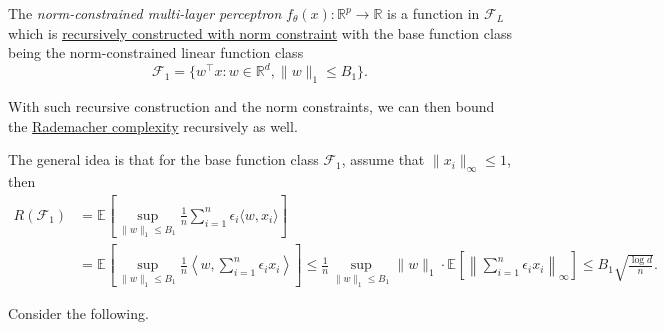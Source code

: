 \begin{definition}\label{def:norm-MLP}
	The \emph{norm-constrained multi-layer perceptron} \(f_\theta (x) \colon \mathbb{R} ^p \to \mathbb{R} \) is a function in \(\mathscr{F} _L\) which is \hyperref[def:norm-recursive]{recursively constructed with norm constraint} with the base function class being the norm-constrained linear function class
	\[
		\mathscr{F} _1 = \{ w^{\top} x \colon w \in \mathbb{R} ^d, \lVert w \rVert _1 \leq B_1 \}.
	\]
\end{definition}

With such recursive construction and the norm constraints, we can then bound the \hyperref[def:Rademacher-complexity]{Rademacher complexity} recursively as well.

\begin{intuition}\label{int:recursive}
	The general idea is that for the base function class \(\mathscr{F} _1\), assume that \(\lVert x_i \rVert _\infty \leq 1\), then
	\[
		\begin{split}
			R(\mathscr{F} _1)
			 & = \mathbb{E}_{}\left[\sup _{\lVert w \rVert _1 \leq B_1} \frac{1}{n} \sum_{i=1}^{n} \epsilon _i \langle w, x_i \rangle  \right]             \\
			 & =  \mathbb{E}_{}\left[\sup _{\lVert w \rVert _1 \leq B_1} \frac{1}{n} \left\langle w, \sum_{i=1}^{n} \epsilon _i x_i \right\rangle  \right]
			\leq \frac{1}{n} \sup _{\lVert w \rVert _1 \leq B_1} \lVert w \rVert _1 \cdot \mathbb{E}_{}\left[\left\lVert \sum_{i=1}^{n} \epsilon _i x_i \right\rVert _\infty  \right]
			\leq B_1 \sqrt{\frac{\log d}{n}} .
		\end{split}
	\]
\end{intuition}

Consider the following.

